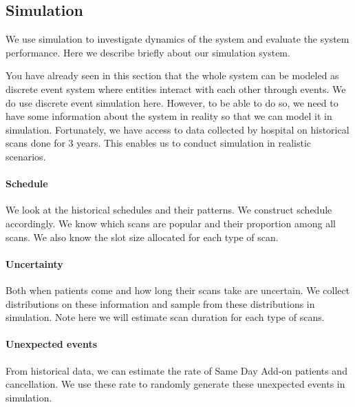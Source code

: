 \subsection{Simulation}

We use simulation to investigate dynamics of the system and evaluate the system performance. Here we describe briefly about our simulation system.

You have already seen in this section that the whole system can be modeled as discrete event system where entities interact with each other through events. We do use discrete event simulation here. However, to be able to do so, we need to have some information about the system in reality so that we can model it in simulation. Fortunately, we have access to data collected by hospital on historical scans done for 3 years. This enables us to conduct simulation in realistic scenarios.

\paragraph{Schedule} We look at the historical schedules and their patterns. We construct schedule accordingly. We know which scans are popular and their proportion among all scans. We also know the slot size allocated for each type of scan.
\paragraph{Uncertainty} Both when patients come and how long their scans take are uncertain. We collect distributions on these information and sample from these distributions in simulation. Note here we will estimate scan duration for each type of scans.
\paragraph{Unexpected events} From historical data, we can estimate the rate of Same Day Add-on patients and cancellation. We use these rate to randomly generate these unexpected events in simulation.

